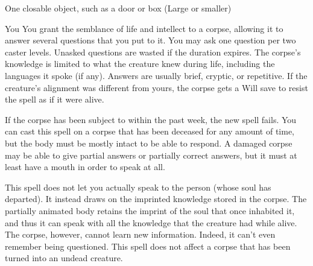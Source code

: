 \begin{spelltarget}{One closable object, such as a door or box (Large or smaller)}
\begin{spelltarget}{You}
\spelleffect You grant the semblance of life and intellect to a corpse, allowing it to answer several questions that you put to it. You may ask one question per two caster levels. Unasked questions are wasted if the duration expires. The corpse's knowledge is limited to what the creature knew during life, including the languages it spoke (if any). Answers are usually brief, cryptic, or repetitive. If the creature's alignment was different from yours, the corpse gets a Will save to resist the spell as if it were alive.
\par If the corpse has been subject to  within the past week, the new spell fails. You can cast this spell on a corpse that has been deceased for any amount of time, but the body must be mostly intact to be able to respond. A damaged corpse may be able to give partial answers or partially correct answers, but it must at least have a mouth in order to speak at all.
\par This spell does not let you actually speak to the person (whose soul has departed). It instead draws on the imprinted knowledge stored in the corpse. The partially animated body retains the imprint of the soul that once inhabited it, and thus it can speak with all the knowledge that the creature had while alive. The corpse, however, cannot learn new information. Indeed, it can't even remember being questioned.
\spellnotes This spell does not affect a corpse that has been turned into an undead creature.


\end{spelltarget}
\end{spelltarget}
